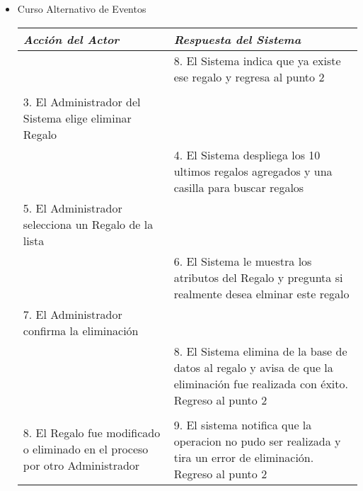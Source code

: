 \begin{itemize}
	\item Curso Alternativo de Eventos  \\
		\begin{tabular}{|p{6.6cm}|p{6.6cm}|}\hline
			\emph{Acción del Actor} & \emph{Respuesta del Sistema}\\\hline
			&8. El Sistema indica que ya existe ese regalo y regresa al punto 2 \\\hline
			&\\\hline
			3. El Administrador del Sistema elige eliminar Regalo& \\\hline
			&4. El Sistema despliega los 10 ultimos regalos agregados y una casilla para buscar regalos\\\hline
			5. El Administrador selecciona un Regalo de la lista&\\\hline
			&6. El Sistema le muestra los atributos del Regalo y pregunta si realmente desea elminar este regalo\\\hline
			7. El Administrador confirma la eliminaci\'on&\\\hline
			&8. El Sistema elimina de la base de datos al regalo y avisa de que la eliminaci\'on fue realizada con \'exito. Regreso al punto 2\\\hline
			&\\\hline
			8. El Regalo fue modificado o eliminado en el proceso por otro Administrador & 9. El sistema notifica que la operacion no pudo ser realizada y tira un error de eliminaci\'on. Regreso al punto 2  \\\hline
		\end{tabular}
\end{itemize}

